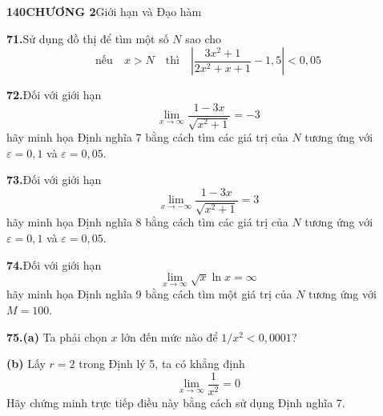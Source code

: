{\small
\textbf{140}\qquad \textbf{CHƯƠNG 2}\quad Giới hạn và Đạo hàm
}
\vspace{5mm}

\noindent
\begin{minipage}[t]{0.485\textwidth}
\small
\noindent
\graphicon \textbf{71.}\hspace{1.5mm}Sử dụng đồ thị để tìm một số $N$ sao cho
\begin{equation*}
\text{nếu}\quad x > N \quad \text{thì}\quad \left| \frac{3x^2+1}{2x^2+x+1} - 1{,}5 \right| < 0{,}05
\end{equation*}

\vspace{2.8mm}
\noindent
\graphicon \textbf{72.}\hspace{1.5mm}Đối với giới hạn
\begin{equation*}
\lim_{x \to \infty} \frac{1-3x}{\sqrt{x^2+1}} = -3
\end{equation*}
hãy minh họa Định nghĩa 7 bằng cách tìm các giá trị của $N$ tương ứng với $\varepsilon = 0{,}1$ và $\varepsilon = 0{,}05$.

\vspace{2.8mm}
\noindent
\graphicon \textbf{73.}\hspace{1.5mm}Đối với giới hạn
\begin{equation*}
\lim_{x \to -\infty} \frac{1-3x}{\sqrt{x^2+1}} = 3
\end{equation*}
hãy minh họa Định nghĩa 8 bằng cách tìm các giá trị của $N$ tương ứng với $\varepsilon = 0{,}1$ và $\varepsilon = 0{,}05$.

\vspace{2.8mm}
\noindent
\graphicon \textbf{74.}\hspace{1.5mm}Đối với giới hạn
\begin{equation*}
\lim_{x \to \infty} \sqrt{x}\ln x = \infty
\end{equation*}
hãy minh họa Định nghĩa 9 bằng cách tìm một giá trị của $N$ tương ứng với $M = 100$.

\vspace{2.8mm}
\noindent
\textbf{75.}\hspace{1.5mm}\textbf{(a)} Ta phải chọn $x$ lớn đến mức nào để $1/x^2 < 0{,}0001$?

\vspace{1mm}
\noindent
\textbf{(b)} Lấy $r = 2$ trong Định lý 5, ta có khẳng định
\begin{equation*}
\lim_{x \to \infty} \frac{1}{x^2} = 0
\end{equation*}
Hãy chứng minh trực tiếp điều này bằng cách sử dụng Định nghĩa 7.
\end{minipage}%
